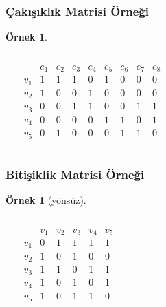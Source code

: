 \documentclass[dvipsnames]{beamer}
\theoremstyle{definition}
\theoremstyle{example}
\newtheorem{ornek}[theorem]{Örnek}
\theoremstyle{plain}
\begin{document}
\begin{frame}
  \frametitle{Çakışıklık Matrisi Örneği}

  \begin{ornek}
    \begin{columns}
      \begin{center}
      \end{center}

      \[
        \begin{array}{c|cccccccc}
              & e_1 & e_2 & e_3 & e_4 & e_5 & e_6 & e_7 & e_8\\\hline
          v_1 & 1 & 1 & 1 & 0 & 1 & 0 & 0 & 0\\
          v_2 & 1 & 0 & 0 & 1 & 0 & 0 & 0 & 0\\
          v_3 & 0 & 0 & 1 & 1 & 0 & 0 & 1 & 1\\
          v_4 & 0 & 0 & 0 & 0 & 1 & 1 & 0 & 1\\
          v_5 & 0 & 1 & 0 & 0 & 0 & 1 & 1 & 0
        \end{array}
      \]
    \end{columns}
  \end{ornek}
\end{frame}

\begin{frame}
  \frametitle{Bitişiklik Matrisi Örneği}

  \begin{ornek}[yönsüz]
    \begin{columns}
      \begin{center}
      \end{center}

      \[
        \begin{array}{c|ccccc}
                & v_1 & v_2 & v_3 & v_4 & v_5\\\hline
            v_1 & 0 & 1 & 1 & 1 & 1\\
            v_2 & 1 & 0 & 1 & 0 & 0\\
            v_3 & 1 & 1 & 0 & 1 & 1\\
            v_4 & 1 & 0 & 1 & 0 & 1\\
            v_5 & 1 & 0 & 1 & 1 & 0
        \end{array}
      \]
    \end{columns}
  \end{ornek}
\end{frame}
\end{document}
